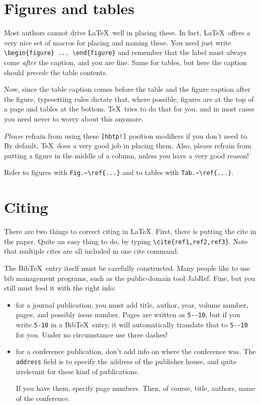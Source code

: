 \documentclass{article}
\begin{document}
\section{Figures and tables}
Most authors cannot drive \LaTeX\ well in placing these.  In fact, \LaTeX\ offers a very nice
set of macros for placing and naming these.  You need just write
\verb+\begin{figure} ... \end{figure}+ and remember that the label must always come
\textsl{after} the caption, and you are fine.  Same for tables, but here the caption should
\textsl{precede} the table contents.

Now, since the table caption comes before the table and the figure caption after the figure,
typesetting rules dictate that, where possible, figures are at the top of a page and
tables at the bottom.  \TeX\ tries to do that for you, and in most cases you need never
to worry about this anymore.

\textsl{Please} refrain from using these \verb+[hbtp!]+ position modifiers if you don't need
to.  By default, \TeX\ does a very good job in placing them.  Also, please refrain from putting
a figure in the middle of a column, unless you have a very good reason!

Refer to figures with \verb+Fig.~\ref{...}+ and to tables with \verb+Tab.~\ref{...}+.


\section{Citing}
There are two things to correct citing in \LaTeX.  First, there is putting the cite in the
paper. Quite an easy thing to do, by typing \verb+\cite{ref1,ref2,ref3}+. Note that
multiple cites are all included in one cite command.

The Bib\TeX\ entry itself must be carefully constructed.  Many people like to use
bib management programs, such as the public-domain tool JabRef.  Fine, but you
still must feed it with the right info:
\begin{itemize}
\item for a journal publication, you must add title, author, year, volume number,
pages, and possibly issue number.  Pages are written as \verb+5--10+, but if
you write \verb+5-10+ in a Bib\TeX\ entry, it will automatically translate that
to \verb+5--10+ for you.  Under no circumstance use three dashes!
\item for a conference publication, don't add info on where the conference was.
The \verb+address+ field is to specify the address of the publisher house, and quite
irrelevant for these kind of publications.

If you have them, specify page numbers.  Then, of course, title, authors, name of the 
conference.
\end{itemize}
\end{document}
